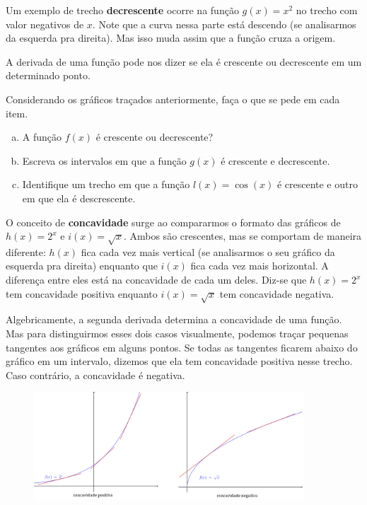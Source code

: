 \documentclass[main_estudante.tex]{subfiles}
\begin{document}
Um exemplo de trecho \textbf{decrescente} ocorre na função $g(x)=x^2$ no trecho com valor negativos de $x$. Note que a curva nessa parte está descendo (se analisarmos da esquerda pra direita). Mas isso muda assim que a função cruza a origem.

A derivada de uma função pode nos dizer se ela é crescente ou decrescente em um determinado ponto.

\begin{questao}
Considerando os gráficos traçados anteriormente, faça o que se pede em cada item.
\begin{enumerate}[a)]
\item A função $f(x)$ é crescente ou decrescente?
\item Escreva os intervalos em que a função $g(x)$ é crescente e decrescente.
\item Identifique um trecho em que a função $l(x)=\cos(x)$ é crescente e outro em que ela é descrescente.
\end{enumerate}
\end{questao}

O conceito de \textbf{concavidade} surge ao compararmos o formato das gráficos de $h(x)=2^x$ e $i(x)=\sqrt{x}$. Ambos são crescentes, mas se comportam de maneira diferente: $h(x)$ fica cada vez mais vertical (se analisarmos o seu gráfico da esquerda pra direita) enquanto que $i(x)$ fica cada vez mais horizontal. A diferença entre eles está na concavidade de cada um deles. Diz-se que $h(x)=2^x$ tem concavidade positiva enquanto $i(x)=\sqrt{x}$ tem concavidade negativa.

Algebricamente, a segunda derivada determina a concavidade de uma função. Mas para distinguirmos esses dois casos visualmente, podemos traçar pequenas tangentes aos gráficos em alguns pontos. Se todas as tangentes ficarem abaixo do gráfico em um intervalo, dizemos que ela tem concavidade positiva nesse trecho. Caso contrário, a concavidade é negativa.

\begin{figure}[h]
\centering
\includegraphics[width=0.9\textwidth]{./img/c7q2.png}
\end{figure}
\end{document}
